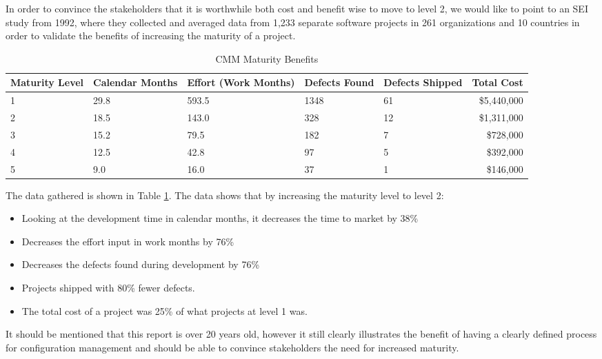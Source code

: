 \documentclass[10pt]{article}
\begin{document}
\noindent In order to convince the stakeholders that it is worthwhile both cost and benefit wise to move to level 2, we would like to point to an SEI study \cite{Merant} from 1992, where they collected and averaged data from 1,233 separate software projects in 261 organizations and 10 countries in order to validate the benefits of increasing the maturity of a project.
\\
\begin{table}[h!]
    \centering
        \begin{tabular}{| p{2cm} | p{2cm} | p{2cm} | l | l | r |}
         \hline
        Maturity Level & Calendar Months & Effort (Work Months) & Defects Found & Defects Shipped & Total Cost \\ \hline
        1 & 29.8 & 593.5 & 1348 & 61 & \$5,440,000 \\ \hline
        2 & 18.5 & 143.0 & 328 & 12 & \$1,311,000 \\ \hline
        3 & 15.2 & 79.5 & 182 & 7 & \$728,000 \\ \hline
        4 & 12.5 & 42.8 & 97 & 5 & \$392,000 \\ \hline
        5 & 9.0 & 16.0 & 37 & 1 & \$146,000 \\ \hline
    \end{tabular}
    \caption{CMM Maturity Benefits}
    \label{table:CMM}
\end{table}

\noindent The data gathered is shown in Table \ref{table:CMM}. The data shows that by increasing the maturity level to level 2:
\begin{itemize}
\item Looking at the development time in calendar months, it decreases the time to market by 38\%
\item Decreases the effort input in work months by 76\%
\item Decreases the defects found during development by 76\%
\item Projects shipped with 80\% fewer defects.
\item The total cost of a project was 25\% of what projects at level 1 was. \\
\end{itemize} 

\noindent It should be mentioned that this report is over 20 years old, however it still clearly illustrates the benefit of having a clearly defined process for configuration management and should be able to convince stakeholders the need for increased maturity.
\end{document}
